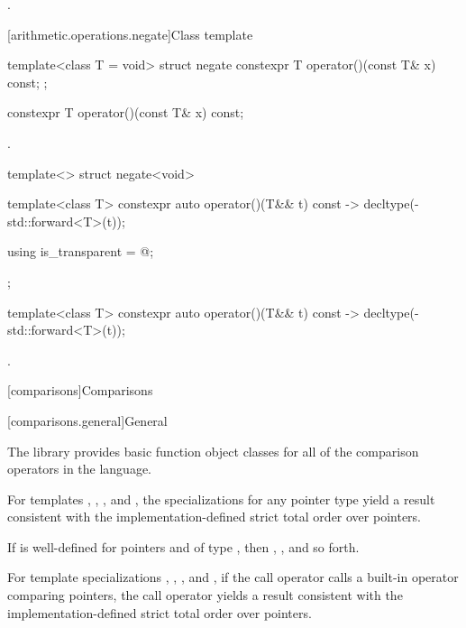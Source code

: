 \begin{itemdescr}
\pnum
\returns
{}.
\end{itemdescr}

[arithmetic.operations.negate]{Class template }

%
\begin{itemdecl}
template<class T = void> struct negate {
  constexpr T operator()(const T& x) const;
};
\end{itemdecl}

%
\begin{itemdecl}
constexpr T operator()(const T& x) const;
\end{itemdecl}

\begin{itemdescr}
\pnum
\returns
{}.
\end{itemdescr}

%
\begin{itemdecl}
template<> struct negate<void> {
  template<class T> constexpr auto operator()(T&& t) const
    -> decltype(-std::forward<T>(t));

  using is_transparent = @\unspec@;
};
\end{itemdecl}

%
\begin{itemdecl}
template<class T> constexpr auto operator()(T&& t) const
    -> decltype(-std::forward<T>(t));
\end{itemdecl}

\begin{itemdescr}
\pnum
\returns
{}.
\end{itemdescr}


[comparisons]{Comparisons}

[comparisons.general]{General}

\pnum
The library provides basic function object classes for all of the comparison
operators in the language.

\pnum
For templates , , , and
, the specializations for any pointer type
yield a result consistent with the
implementation-defined strict total order over pointers.
\begin{note}
If  is well-defined
for pointers  and  of type ,
then ,
, and so forth.
\end{note}
For template specializations , ,
, and ,
if the call operator calls a built-in operator comparing pointers,
the call operator yields a result consistent
with the implementation-defined strict total order over pointers.

